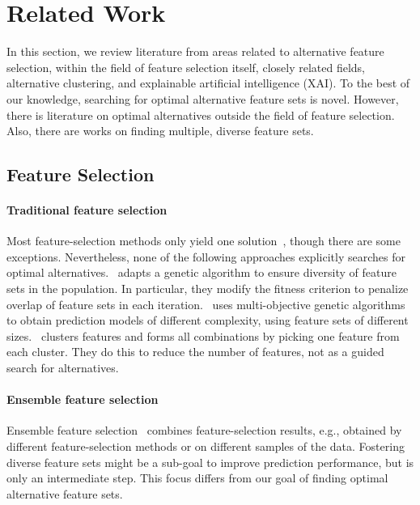 \documentclass{article}
\theoremstyle{definition}
\begin{document}
\section{Related Work}
\label{sec:afs:related-work}

In this section, we review literature from areas related to alternative feature selection, within the field of feature selection itself, closely related fields, alternative clustering, and explainable artificial intelligence (XAI).
To the best of our knowledge, searching for optimal alternative feature sets is novel.
However, there is literature on optimal alternatives outside the field of feature selection.
Also, there are works on finding multiple, diverse feature sets.

\subsection{Feature Selection}

\paragraph{Traditional feature selection}

Most feature-selection methods only yield one solution~\cite{borboudakis2021extending}, though there are some exceptions.
Nevertheless, none of the following approaches explicitly searches for optimal alternatives.
\cite{siddiqi2020genetic}~adapts a genetic algorithm to ensure diversity of feature sets in the population.
In particular, they modify the fitness criterion to penalize overlap of feature sets in each iteration.
\cite{emmanouilidis1999selecting}~uses multi-objective genetic algorithms to obtain prediction models of different complexity, using feature sets of different sizes.
\cite{mueller2021feature}~clusters features and forms all combinations by picking one feature from each cluster.
They do this to reduce the number of features, not as a guided search for alternatives.

\paragraph{Ensemble feature selection}

Ensemble feature selection~\cite{saeys2008robust, seijo2017ensemble} combines feature-selection results, e.g., obtained by different feature-selection methods or on different samples of the data.
Fostering diverse feature sets might be a sub-goal to improve prediction performance, but is only an intermediate step.
This focus differs from our goal of finding optimal alternative feature sets.
\end{document}
